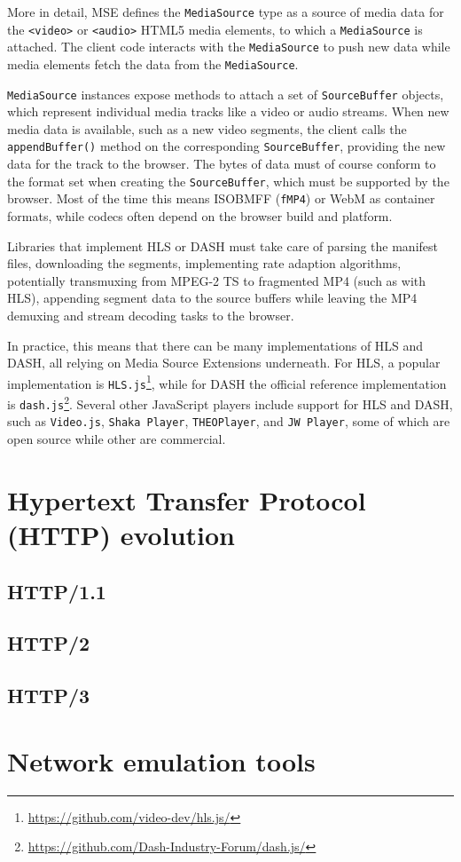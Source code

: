 More in detail, MSE defines the \texttt{MediaSource} type as a source of media data for the \texttt{<video>} or \texttt{<audio>} HTML5 media elements, to which a \texttt{MediaSource} is attached. The client code interacts with the \texttt{MediaSource} to push new data while media elements fetch the data from the \texttt{MediaSource}.

\texttt{MediaSource} instances expose methods to attach a set of \texttt{SourceBuffer} objects, which represent individual media tracks like a video or audio streams. When new media data is available, such as a new video segments, the client calls the \texttt{appendBuffer()} method on the corresponding \texttt{SourceBuffer}, providing the new data for the track to the browser. The bytes of data must of course conform to the format set when creating the \texttt{SourceBuffer}, which must be supported by the browser. Most of the time this means ISOBMFF (\texttt{fMP4}) or WebM as container formats, while codecs often depend on the browser build and platform.

Libraries that implement HLS or DASH must take care of parsing the manifest files, downloading the segments, implementing rate adaption algorithms, potentially transmuxing from MPEG-2 TS to fragmented MP4 (such as with HLS), appending segment data to the source buffers while leaving the MP4 demuxing and stream decoding tasks to the browser.

In practice, this means that there can be many implementations of HLS and DASH, all relying on Media Source Extensions underneath. For HLS, a popular implementation is \texttt{HLS.js}\footnote{\url{https://github.com/video-dev/hls.js/}}, while for DASH the official reference implementation is \texttt{dash.js}\footnote{\url{https://github.com/Dash-Industry-Forum/dash.js/}}. Several other JavaScript players include support for HLS and DASH, such as \texttt{Video.js}, \texttt{Shaka Player}, \texttt{THEOPlayer}, and \texttt{JW Player}, some of which are open source while other are commercial.

\section{Hypertext Transfer Protocol (HTTP) evolution}
\label{sec:bg/http}

\subsection{HTTP/1.1}
\label{sec:bg/http1}

\subsection{HTTP/2}
\label{sec:bg/http2}

\subsection{HTTP/3}
\label{sec:bg/http3}

\section{Network emulation tools}
